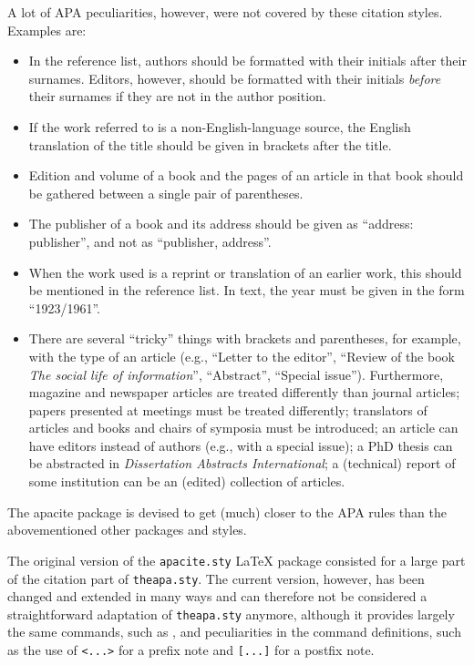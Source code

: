 \documentclass{article}
\newcommand{\pkg}[1]{\textsf{#1}}%
\newcommand{\fname}[1]{\texttt{#1}}%
\newcommand{\cmd}[1]{\texttt{\string#1}}%
\begin{document}
A lot of APA peculiarities, however, were not covered by these citation
styles. Examples are:
\begin{itemize}
    \item In the reference list, authors should be formatted with
          their initials after their surnames. Editors, however,
          should be formatted with their initials \emph{before} their
          surnames if they are not in the author position.
    \item If the work referred to is a non-English-language source,
          the English translation of the title should be given in
          brackets after the title.
    \item Edition and volume of a book and the pages of an article
          in that book should be gathered between a single pair
          of parentheses.
    \item The publisher of a book and its address should be given as
          ``address: publisher'', and not as ``publisher, address''.
    \item When the work used is a reprint or translation of an
          earlier work, this should be mentioned in the reference
          list. In text, the year must be given in the form
          ``1923/1961''.
    \item There are several ``tricky'' things with brackets and
          parentheses, for example, with the type of an article
          (e.g., ``Letter to the editor'',
          ``Review of the book \emph{The social life of information}'',
          ``Abstract'', ``Special issue''). Furthermore, magazine and
          newspaper articles are treated differently than journal
          articles; papers presented at meetings must be treated
          differently; translators of articles and books and chairs
          of symposia must be introduced; an article can have editors
          instead of authors (e.g., with a special issue); a PhD thesis
          can be abstracted in \emph{Dissertation Abstracts International};
          a (technical) report of some institution can be an (edited)
          collection of articles.
\end{itemize}
The \pkg{apacite} package is devised to get (much) closer to the APA rules
than the abovementioned other packages and styles.

The original version of the \fname{apacite.sty} \LaTeX{} package consisted for
a large part of the citation part of \fname{theapa.sty}. The current version,
however, has been changed and extended in many ways and can therefore not be
considered a straightforward adaptation of \fname{theapa.sty} anymore,
although it provides largely the same commands, such as \cmd{\citeA}, and
peculiarities in the command definitions, such as the use of \verb+<...>+ for
a prefix note and \verb+[...]+ for a postfix note.
\end{document}
